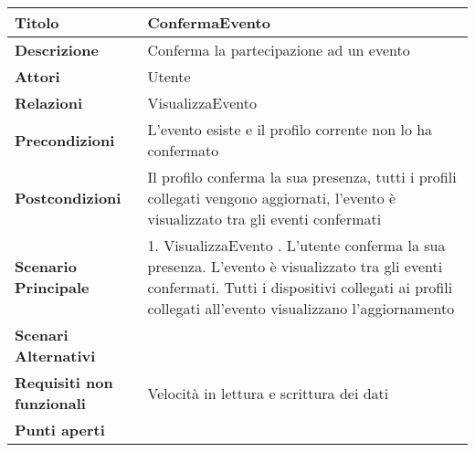 \begin{tabular} {|P{4.5cm}|P{11cm}|}
  \hline
  \textbf{Titolo}                   & ConfermaEvento                                                                                                                       \\
  \hline
  \textbf{Descrizione}              & Conferma la partecipazione ad un evento                                                                                              \\
  \hline
  \textbf{Attori}                   & Utente                                                                                                                               \\
  \hline
  \textbf{Relazioni}                & VisualizzaEvento                                                                                                                     \\
  \hline
  \textbf{Precondizioni}            & L'evento esiste e il profilo corrente non lo ha confermato                                                                           \\
  \hline
  \textbf{Postcondizioni}           & Il profilo conferma la sua presenza, tutti i profili collegati vengono aggiornati, l'evento è visualizzato tra gli eventi confermati \\
  \hline
  \textbf{Scenario Principale}      & 1. VisualizzaEvento . L'utente conferma la sua presenza. L'evento è visualizzato tra gli eventi confermati. Tutti i dispositivi collegati ai profili collegati all'evento visualizzano l'aggiornamento                                                                            \\
  \hline
  \textbf{Scenari Alternativi}      &                                                                                                                                      \\
  \hline
  \textbf{Requisiti non funzionali} & Velocità in lettura e scrittura dei dati                                                                                             \\
  \hline
  \textbf{Punti aperti}             &                                                                                                                                      \\
  \hline
\end{tabular}
\hfill
\break


